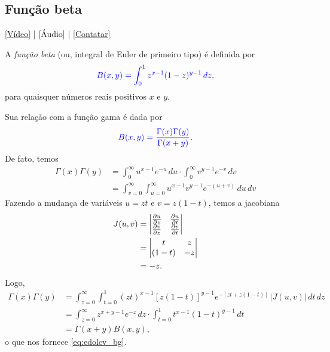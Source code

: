 \subsection{Função beta}

\begin{flushright}
  \href{https://archive.org/details/funcao-beta}{[Vídeo]} | [Áudio] | \href{https://phkonzen.github.io/notas/contato.html}{[Contatar]}
\end{flushright}

A \emph{função beta} (ou, integral de Euler de primeiro tipo) é definida por
\begin{equation}
  {\color{blue}B(x,y) = \int_0^1 z^{x-1}(1-z)^{y-1}\,dz},
\end{equation}
para quaisquer números reais positivos $x$ e $y$.

Sua relação com a função gama é dada por
\begin{equation}\label{eq:edolcv_bg}
  {\color{blue}B(x,y) = \frac{\Gamma(x)\Gamma(y)}{\Gamma(x+y)}}.
\end{equation}
De fato, temos
\begin{align}
  \Gamma(x)\Gamma(y) &= \int_0^\infty u^{x-1}e^{-u}\,du\cdot\int_0^\infty v^{y-1}e^{-v}\,dv \\
  &= \int_{v=0}^\infty\int_{u=0}^\infty u^{x-1}v^{y-1}e^{-(u+v)}\,du\,dv
\end{align}
Fazendo a mudança de variáveis $u=zt$ e $v=z(1-t)$, temos a jacobiana
\begin{align}
  J(u,v) &=
  \begin{vmatrix}
    \frac{\partial u}{\partial z} & \frac{\partial u}{\partial t}\\
    \frac{\partial v}{\partial z} & \frac{\partial v}{\partial t}
  \end{vmatrix}\\
  &= \begin{vmatrix}
    t & z\\
    (1-t) & -z
  \end{vmatrix}\\
  &= -z.
\end{align}
Logo,
\begin{align}
  \Gamma(x)\Gamma(y) &= \int_{z=0}^\infty\int_{t=0}^1 (zt)^{x-1}[z(1-t)]^{y-1}e^{-[zt+z(1-t)]}\,|J(u,v)|\,dt\,dz\\
  &= \int_{z=0}^\infty z^{x+y-1}e^{-z}\,dz\cdot \int_{t=0}^1 t^{x-1}(1-t)^{y-1}\,dt\\
  &= \Gamma(x+y) B(x,y),
\end{align}
o que nos fornece \eqref{eq:edolcv_bg}.

